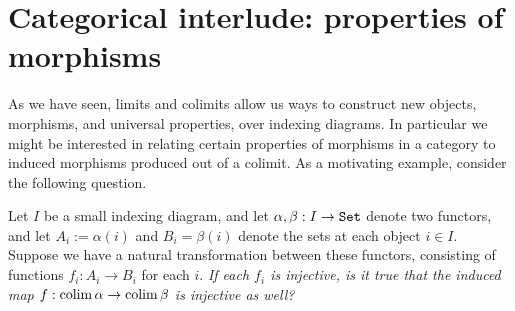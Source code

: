 \documentclass{article}[11pt]
\begin{document}

\appendix
\section{Categorical interlude: properties of morphisms}

As we have seen, limits and colimits allow us ways to construct new objects, morphisms, and universal properties, over indexing diagrams. In particular we might be interested in relating certain properties of morphisms in a category to induced morphisms produced out of a colimit. As a motivating example, consider the following question.

\begin{question} Let $I$ be a small indexing diagram, and let $\alpha,\beta: I \to \texttt{Set}$ denote two functors, and let $A_i := \alpha(i)$ and $B_i = \beta(i)$ denote the sets at each object $i\in I$. Suppose we have a natural transformation between these functors, consisting of functions $f_i : A_i \to B_i$ for each $i$. \textit{If each $f_i$ is injective, is it true that the induced map $f: \mathop{\operatorname*{colim}} \alpha \to \mathop{\operatorname*{colim}} \beta$ is injective as well?}
\end{question}
\end{document}
